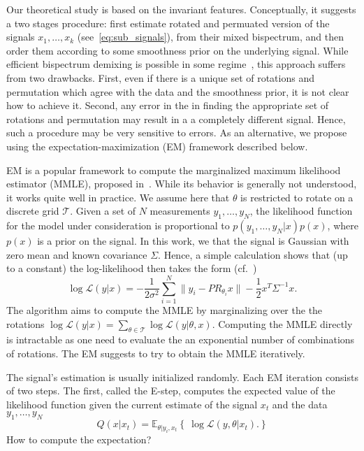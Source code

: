 \documentclass[english,12pt]{article}
\newcommand{\E}{\mathbb{E}}
\numberwithin{equation}{section}
\numberwithin{thm}{section} %
\begin{document}
Our theoretical study is based on the invariant features. Conceptually, it suggests a two stages procedure: first estimate rotated and permuated version of the signals $x_1,\ldots,x_k$ (see~\eqref{eq:sub_signals}), from their mixed bispectrum, and then order them according to some smoothness prior on the underlying signal. While efficient bispectrum demixing is possible in some regime~\cite{boumal2018heterogeneous}, this approach suffers from two drawbacks. First, even if there is a unique set of rotations and permutation which agree with the data and the smoothness prior, it is not clear how to achieve it. Second, any error in the in finding the appropriate set of rotations and permutation may result in a a completely different signal. Hence, such a procedure may be very sensitive to errors. 
As an alternative, we propose using the expectation-maximization (EM) framework described below. 

EM is a popular  framework to compute the marginalized maximum likelihood estimator (MMLE), proposed in~\cite{dempster1977maximum}. While its behavior is generally not understood, it works quite well in practice. We assume here that $\theta$ is restricted to rotate on a discrete grid $\mathcal{T}$. Given a set of $N$ measurements $y_1,\ldots,y_N$, the likelihood function for the model under consideration is proportional to $p(y_1,\ldots,y_N|x)p(x)$, where $p(x)$ is a prior on the signal. In this work, we that the signal is Gaussian with zero mean and known covariance $\Sigma$.
Hence,  a simple calculation shows that (up to a constant) the log-likelihood   then takes the form (cf.~\cite{bendory2017bispectrum,abbe2018multireference})
\begin{equation}
\log \mathcal{L}(y|x)  = -\frac{1}{2\sigma^2}\sum_{i=1}^{N}\|y_i - PR_{\theta_i}x\| - \frac{1}{2}x^T\Sigma^{-1}x.
\end{equation}
The algorithm aims to compute the MMLE by marginalizing over the the rotations  $\log \mathcal{L}(y|x)  = \sum_{\theta\in\mathcal{T}}\log \mathcal{L}(y|\theta,x)$. Computing the MMLE directly is intractable as one need to evaluate the an exponential number of combinations of rotations. The EM suggests to try to obtain the MMLE iteratively. 

The signal's estimation is usually initialized randomly. 
Each EM iteration consists of two steps.
The first, called the E-step, computes the expected value of the likelihood function  given the current estimate of the signal $x_t$ and the data $y_1,\ldots,y_N$
\begin{equation}
Q(x|x_t) = \E_{\theta|y_i,x_t}\left\{\ \log \mathcal{L}(y,\theta|x_t).   \right\}
\end{equation} 
How to compute the expectation?
\end{document}
